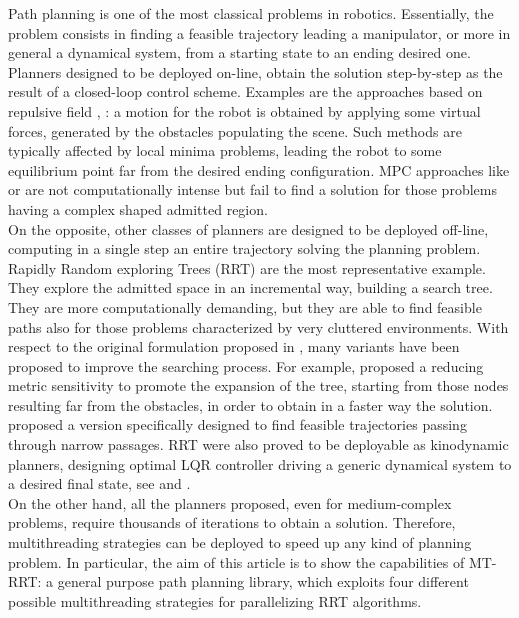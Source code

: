 \documentclass[letterpaper, 10 pt, conference]{ieeeconf}  %
\begin{document}
Path planning is one of the most classical problems in robotics. 
Essentially, the problem consists in finding a feasible trajectory leading a manipulator, or more in general a dynamical system, from a starting state to an ending desired one.
Planners designed to be deployed on-line, obtain the solution step-by-step as the result of a closed-loop control scheme.
Examples are the approaches based on repulsive field \cite{Khatib_repulsive}, \cite{Rimon_repulsive}: a motion for the robot is obtained by applying some virtual forces, generated by the obstacles populating the scene.  
Such methods are typically affected by local minima problems, leading the robot to some equilibrium point far from the desired ending configuration.
MPC approaches like \cite{MPC_01} or \cite{MPC_02} are not computationally intense but fail to find a solution for those problems having a complex shaped admitted region. 
\\
On the opposite, other classes of planners are designed to be deployed off-line, computing in a single step an entire trajectory solving the planning problem. Rapidly Random exploring Trees (RRT) \cite{RRT_LaValle} are the most representative example.
They explore the admitted space in an incremental way, building a search tree. They are more computationally demanding, but they are able to find feasible paths also for those problems characterized by very cluttered environments. 
With respect to the original formulation proposed in \cite{RRT_LaValle}, many variants have been proposed to improve the searching process. For example, \cite{RC_RRT} proposed a reducing metric sensitivity to promote the expansion of the tree, starting from those nodes resulting far from the obstacles, in order to obtain in a faster way the solution. 
\cite{RRT_narrow} proposed a version specifically designed to find feasible trajectories passing through narrow passages.
RRT were also proved to be deployable as kinodynamic planners, designing optimal LQR controller driving a generic dynamical system to a desired final state, see \cite{LQR_RRT_01} and  
\cite{LQR_RRT_02}.
\\
On the other hand, all the planners proposed, even for medium-complex problems, require thousands of iterations to obtain a solution. 
Therefore, multithreading strategies can be deployed to speed up any kind of planning problem.
In particular, the aim of this article is to show the capabilities of MT-RRT: a general purpose path planning library, which exploits four different possible multithreading strategies for parallelizing RRT algorithms. 
\end{document}

